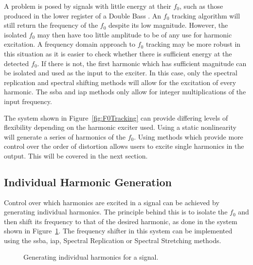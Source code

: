 		A problem is posed by signals with little energy at their $f_{0}$, such as those produced in the lower
		register of a Double Bass \citep{askenfelt2010double}. An $f_{0}$ tracking algorithm will still return the
		frequency of the $f_{0}$ despite its low magnitude. However, the isolated $f_{0}$ may then have too little
		amplitude to be of any use for harmonic excitation. A frequency domain approach to $f_{0}$ tracking may be
		more robust in this situation as it is easier to check whether there is sufficient energy at the detected
		$f_{0}$. If there is not, the first harmonic which has sufficient magnitude can be isolated and used as the
		input to the exciter. In this case, only the spectral replication and spectral shifting methods will allow
		for the excitation of every harmonic. The \acrshort{ssba} and \acrshort{iap} methods only allow for integer
		multiplications of the input frequency.

		The system shown in Figure~\ref{fig:F0Tracking} can provide differing levels of flexibility depending on
		the harmonic exciter used. Using a static nonlinearity will generate a series of harmonics of the $f_{0}$.
		Using methods which provide more control over the order of distortion allows users to excite single
		harmonics in the output. This will be covered in the next section.

	\subsection{Individual Harmonic Generation}
	\label{sec:FeatureControl-Systems-Individuals}
		Control over which harmonics are excited in a signal can be achieved by generating individual harmonics.
		The principle behind this is to isolate the $f_{0}$ and then shift its frequency to that of the desired
		harmonic, as done in the system shown in Figure~\ref{fig:HarmonicGenerationSystem}.  The frequency shifter
		in this system can be implemented using the \acrshort{ssba}, \acrshort{iap}, Spectral Replication or
		Spectral Stretching methods.

		\begin{figure}[h!]
			\centering
			\caption{Generating individual harmonics for a signal.}
			\label{fig:HarmonicGenerationSystem}
		\end{figure}

